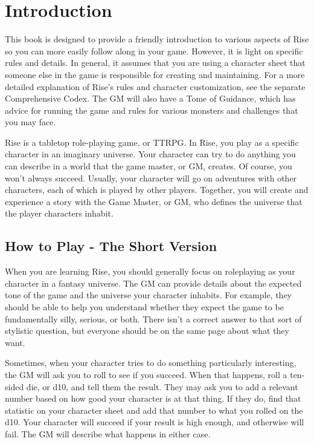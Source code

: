 \chapter{Introduction}

This book is designed to provide a friendly introduction to various aspects of Rise so you can more easily follow along in your game.
However, it is light on specific rules and details.
In general, it assumes that you are using a character sheet that someone else in the game is responsible for creating and maintaining.
For a more detailed explanation of Rise's rules and character customization, see the separate Comprehensive Codex.
The GM will also have a Tome of Guidance, which has advice for running the game and rules for various monsters and challenges that you may face.

  Rise is a tabletop role-playing game, or TTRPG.
  In Rise, you play as a specific character in an imaginary universe.
  Your character can try to do anything you can describe in a world that the game master, or GM, creates.
  Of course, you won't always succeed.
  Usually, your character will go on adventures with other characters, each of which is played by other players.
  Together, you will create and experience a story with the Game Master, or GM, who defines the universe that the player characters inhabit.

\section{How to Play - The Short Version}
  When you are learning Rise, you should generally focus on roleplaying as your character in a fantasy universe.
  The GM can provide details about the expected tone of the game and the universe your character inhabits.
  For example, they should be able to help you understand whether they expect the game to be fundamentally silly, serious, or both.
  There isn't a correct answer to that sort of stylistic question, but everyone should be on the same page about what they want.

  Sometimes, when your character tries to do something particularly interesting, the GM will ask you to roll to see if you succeed.
  When that happens, roll a ten-sided die, or d10, and tell them the result.
  They may ask you to add a relevant number based on how good your character is at that thing.
  If they do, find that statistic on your character sheet and add that number to what you rolled on the d10.
  Your character will succeed if your result is high enough, and otherwise will fail.
  The GM will describe what happens in either case.


